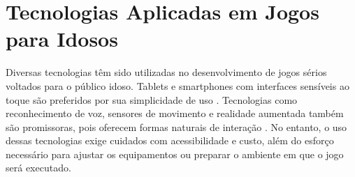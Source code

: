 \section{Tecnologias Aplicadas em Jogos para Idosos}

Diversas tecnologias têm sido utilizadas no desenvolvimento de jogos sérios voltados para o público idoso. Tablets e smartphones com interfaces sensíveis ao toque são preferidos por sua simplicidade de uso \cite{sayago2011everyday}. Tecnologias como reconhecimento de voz, sensores de movimento e realidade aumentada também são promissoras, pois oferecem formas naturais de interação \cite{gerling2012game}. No entanto, o uso dessas tecnologias exige cuidados com acessibilidade e custo, além do esforço necessário para ajustar os equipamentos ou preparar o ambiente em que o jogo será executado.
